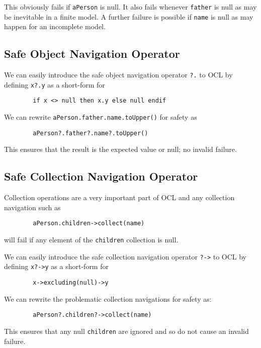 \documentclass{llncs}
\begin{document}
This obviously fails if \verb|aPerson| is null. It also fails whenever \verb|father| is null as may be inevitable in a finite model. A further failure is possible if \verb|name| is null as may happen for an incomplete model.

\subsection{Safe Object Navigation Operator}

We can easily introduce the safe object  navigation operator \verb|?.|  to OCL by defining \verb|x?.y| as a short-form for 

\begin{verbatim}
        if x <> null then x.y else null endif
\end{verbatim}

We can rewrite \verb|aPerson.father.name.toUpper()| for safety as

\begin{verbatim}
        aPerson?.father?.name?.toUpper()
\end{verbatim}

This ensures that the result is the expected value or null; no invalid failure.

\subsection{Safe Collection Navigation Operator}

Collection operations are a very important part of OCL and any collection navigation such as 
\begin{verbatim}
        aPerson.children->collect(name)
\end{verbatim}
will fail if any element of the \verb|children| collection is null.

We can easily introduce the safe collection navigation operator \verb|?->|  to OCL by defining \verb|x?->y| as a short-form for 

\begin{verbatim}
        x->excluding(null)->y
\end{verbatim}

We can rewrite the problematic collection navigations for safety as:

\begin{verbatim}
        aPerson?.children?->collect(name)
\end{verbatim}

This ensures that any null \verb|children| are ignored and so do not cause an invalid failure.
\end{document}
